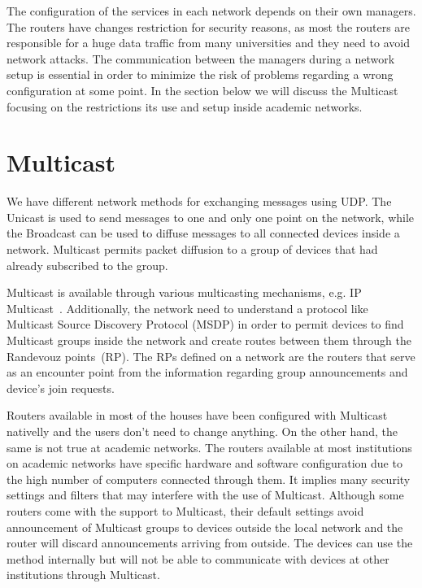 The configuration of the services in each network depends on their own managers.
The routers have changes restriction for security reasons, as most the routers are responsible for a huge data traffic from many universities and they need to avoid network attacks.
The communication between the managers during a network setup is essential in order to minimize the risk of problems regarding a wrong configuration at some point.
In the section below we will discuss the Multicast focusing on the restrictions its use and setup inside academic networks.

\section{Multicast}
\label{sec:multicast}

We have different network methods for exchanging messages using UDP.
The Unicast is used to send messages to one and only one point on the network, while the Broadcast can be used to diffuse messages to all connected devices inside a network.  
Multicast permits packet diffusion to a group of devices that had already subscribed to the group.

Multicast is available through various multicasting mechanisms, e.g. IP Multicast~\citep{Diot2000ipmulticast}.
Additionally, the network need to understand a protocol like Multicast Source Discovery Protocol (MSDP) in order to permit devices to find Multicast groups inside the network and create routes between them through the Randevouz points~(RP).
The RPs defined on a network are the routers that serve as an encounter point from the information regarding group announcements and device's join requests.

Routers available in most of the houses have been configured with Multicast nativelly and the users don't need to change anything.
On the other hand, the same is not true at academic networks.
The routers available at most institutions on academic networks have specific hardware and software configuration due to the high number of computers connected through them.
It implies many security settings and filters that may interfere with the use of Multicast.
Although some routers come with the support to Multicast, their default settings avoid announcement of Multicast groups to devices outside the local network and the router will discard announcements arriving from outside.
The devices can use the method internally but will not be able to communicate with devices at other institutions through Multicast.


